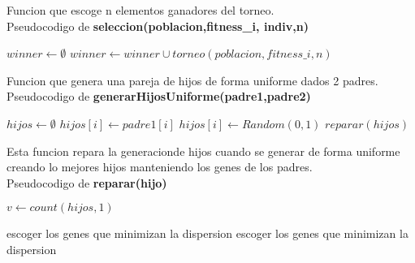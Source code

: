 Funcion que escoge n elementos ganadores del torneo.\\
Pseudocodigo de \textbf{seleccion(poblacion,fitness\_i, indiv,n)}
\begin{algorithm}[H]
  \begin{algorithmic}[1]
      \State $winner \gets \emptyset $
          \State $winner \gets winner \cup torneo(poblacion,fitness\_i,n)$
      \EndFor
      \State {}
    \EndFunction
  \end{algorithmic}
\end{algorithm}

Funcion que genera una pareja de hijos de forma uniforme dados 2 padres.\\

Pseudocodigo de \textbf{generarHijosUniforme(padre1,padre2)}
\begin{algorithm}[H]
  \begin{algorithmic}[1]
      \State $hijos \gets \emptyset$
          \State $hijos[i] \gets padre1[i]$
      \Else
          \State $hijos[i] \gets Random(0,1)$
      \EndIf
      \EndFor
      \State $reparar(hijos)$
      \State {}
    \EndFunction
  \end{algorithmic}
\end{algorithm}

Esta funcion repara la generacionde hijos cuando se generar de forma uniforme creando lo mejores hijos manteniendo 
los genes de los padres.\\

Pseudocodigo de \textbf{reparar(hijo)}
\begin{algorithm}[H]
  \begin{algorithmic}[1]
      \State $v \gets count(hijos,1)$
      
        \State {}
       
          \State escoger los genes que minimizan la dispersion
        \EndWhile
       
          \State escoger los genes que minimizan la dispersion
        \EndWhile
      \EndIf

      \State {}
    \EndFunction
  \end{algorithmic}
\end{algorithm}

